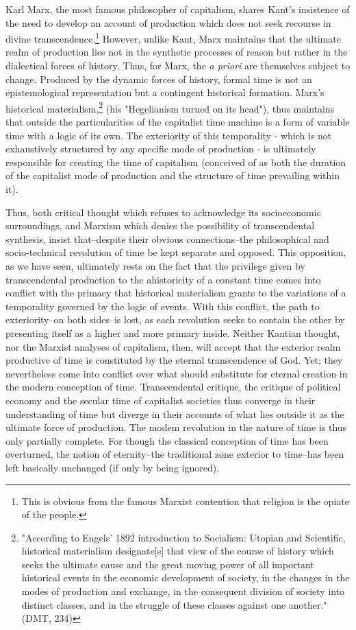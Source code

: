 Karl Marx, the most famous philosopher of capitalism, shares Kant's insistence of the need to develop an account of production which does not seek recourse in divine transcendence.\footnote{This is obvious from the famous Marxist contention that religion is the opiate of the people.} However, unlike Kant, Marx maintains that the ultimate realm of production lies not in the synthetic processes of reason but rather in the dialectical forces of history. Thus, for Marx, the \textit{a priori} are themselves subject to change. Produced by the dynamic forces of history, formal time is not an epistemological representation but a contingent historical formation. Marx's historical materialism,\footnote{"According to Engels' 1892 introduction to Socialism: Utopian and Scientific, historical materialism designate[s] that view of the course of history which seeks the ultimate cause and the great moving power of all important historical events in the economic development of society, in the changes in the modes of production and exchange, in the consequent division of society into distinct classes, and in the struggle of these classes against one another." (DMT, 234)} (his "Hegelianism turned on its head"), thus maintains that outside the particularities of the capitalist time machine is a form of variable time with a logic of its own. The exteriority of this temporality - which is not exhaustively structured by any specific mode of production - is ultimately responsible for creating the time of capitalism (conceived of as both the duration of the capitalist mode of production and the structure of time prevailing within it).

Thus, both critical thought which refuses to acknowledge its socioeconomic surroundings, and Marxism which denies the possibility of transcendental synthesis, insist that--despite their obvious connections--the philosophical and socio-technical revolution of time be kept separate and opposed. This opposition, as we have seen, ultimately rests on the fact that the privilege given by transcendental production to the ahistoricity of a constant time comes into conflict with the primacy that historical materialism grants to the variations of a temporality governed by the logic of events. With this conflict, the path to exteriority--on both sides--is lost, as each revolution seeks to contain the other by presenting itself as a higher and more primary inside. Neither Kantian thought, nor the Marxist analyses of capitalism, then, will accept that the exterior realm productive of time is constituted by the eternal transcendence of God. Yet; they nevertheless come into conflict over what should substitute for eternal creation in the modern conception of time. Transcendental critique, the critique of political economy and the secular time of capitalist societies thus converge in their understanding of time but diverge in their accounts of what lies outside it as the ultimate force of production. The modem revolution in the nature of time is thus only partially complete. For though the classical conception of time has been overturned, the notion of eternity--the traditional zone exterior to time--has been left basically unchanged (if only by being ignored). 

